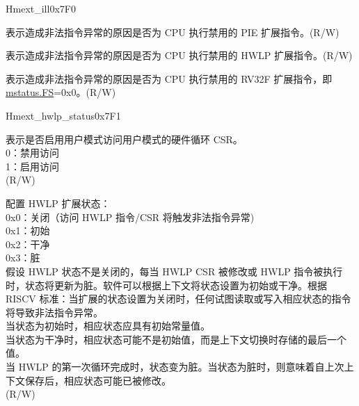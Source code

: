 \begin{register}{H}{mext\_ill}{0x7F0}\label{regdesc:MEXT_ILL}%
%
%
%
%
\regnewline%
\begin{regdesc}\begin{reglist}
\label{fielddesc:MEXT_ILL_PIE_ILL}\item [PIE\_ILL] 表示造成非法指令异常的原因是否为 CPU 执行禁用的 PIE 扩展指令。(R/W)
\label{fielddesc:MEXT_ILL_HWLP_ILL}\item [HWLP\_ILL] 表示造成非法指令异常的原因是否为 CPU 执行禁用的 HWLP 扩展指令。(R/W)
\label{fielddesc:MEXT_ILL_FP_ILL}\item [FP\_ILL] 表示造成非法指令异常的原因是否为 CPU 执行禁用的 RV32F 扩展指令，即 \hyperref[fielddesc:MSTATUS_FS]{mstatus.FS}=0x0。(R/W)
\end{reglist}\end{regdesc}
\end{register}

\begin{register}{H}{mext\_hwlp\_status}{0x7F1}\label{regdesc:MEXT_HWLP_STATUS}
%
%
%
\regnewline%
\begin{regdesc}\begin{reglist}
\label{fielddesc:MEXT_HWLP_URW}\item [URW] 表示是否启用用户模式访问用户模式的硬件循环 CSR。\\
0：禁用访问\\
1：启用访问\\
(R/W)
\label{fielddesc:MEXT_HWLP_STATE}\item [STATE] 配置 HWLP 扩展状态：\\
0x0：关闭（访问 HWLP 指令/CSR 将触发非法指令异常) \\
0x1：初始 \\
0x2：干净 \\
0x3：脏 \\
假设 HWLP 状态不是关闭的，每当 HWLP CSR 被修改或 HWLP 指令被执行时，状态将更新为脏。软件可以根据上下文将状态设置为初始或干净。根据 RISCV 标准：当扩展的状态设置为关闭时，任何试图读取或写入相应状态的指令将导致非法指令异常。\\
当状态为初始时，相应状态应具有初始常量值。\\
当状态为干净时，相应状态可能不是初始值，而是上下文切换时存储的最后一个值。\\
当 HWLP 的第一次循环完成时，状态变为脏。当状态为脏时，则意味着自上次上下文保存后，相应状态可能已被修改。\\
(R/W)
\end{reglist}\end{regdesc}
\end{register}

